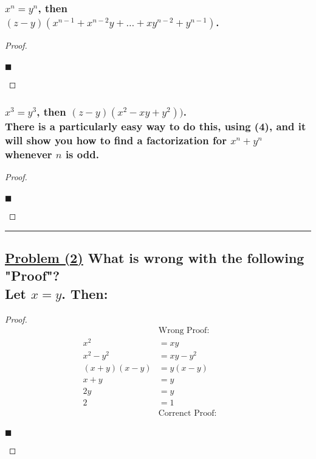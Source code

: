 \documentclass[letterpaper, 10 pt, conference]{ieeeconf}  %
\begin{document}
\subsubsection{\textbf{$x^n = y^n$, then \\ $(z - y)(x^{n-1} + x^{n-2}y + \dots + xy^{n-2} + y^{n-1})$.}}

\begin{proof}
\begin{align}
    
\end{align}
\begin{flushright}
$\blacksquare$
\end{flushright}
\end{proof}

\subsubsection{\textbf{$x^3 = y^3$, then $(z - y)(x^2 - xy +y^2))$. \\ \small{There is a particularly easy way to do this, using (4), and it will show you how to find a factorization for $x^n + y^n$} whenever $n$ is odd.}}

\begin{proof}
\begin{align}
    
\end{align}
\begin{flushright}
$\blacksquare$
\end{flushright}
\end{proof}

\noindent\rule{8cm}{0.4pt}

\subsection{\textbf{\underline{Problem (2)} What is wrong with the following "Proof"? \\ Let $x = y$. Then:}}

\begin{proof}
\begin{align}
    &\text{Wrong Proof: }&&\\
    x^2 &= xy&&\\
    x^2 - y^2 &= xy - y^2&&\\
    (x + y)(x - y) &= y(x - y)&&\\
    x + y&= y&&\\
    2y &= y &&\\
    2& = 1&&\\
    &\text{Correnct Proof: }&&\\
\end{align}
\begin{flushright}
$\blacksquare$
\end{flushright}
\end{proof}
\end{document}
